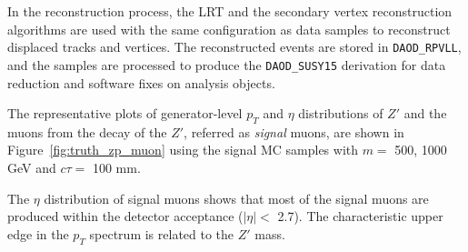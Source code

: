 In the reconstruction process, the LRT and the secondary vertex reconstruction algorithms are used with the same configuration as data samples to reconstruct displaced tracks and vertices. The reconstructed events are stored in \texttt{DAOD\_RPVLL}, and the samples are processed to produce the \texttt{DAOD\_SUSY15} derivation for data reduction and software fixes on analysis objects.

The representative plots of generator-level $p_{T}$ and $\eta$ distributions of $Z'$ and the muons from the decay of the $Z'$, referred as \textit{signal} muons, are shown in Figure~\ref{fig:truth_zp_muon} using the signal MC samples with $m=$ 500, 1000 GeV and $c\tau=$ 100 mm. %

The $\eta$ distribution of signal muons shows that most of the signal muons are produced within the detector acceptance ($|\eta| <$ 2.7). The characteristic upper edge in the $p_{T}$ spectrum is related to the $Z'$ mass.


